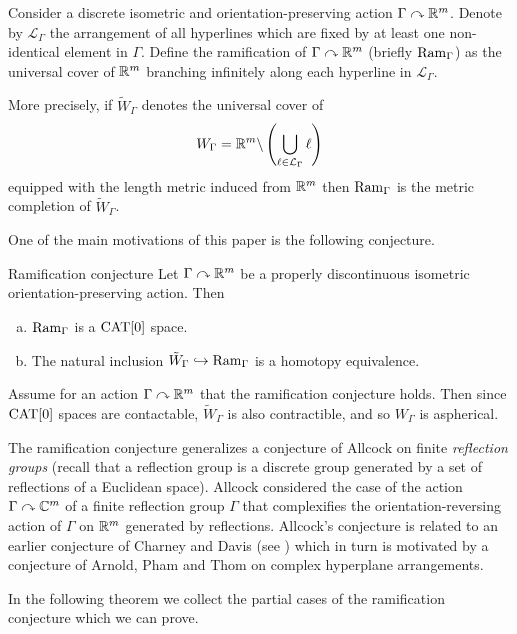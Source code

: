 \documentclass[oneside,a4paper]{article}
\begin{document}
Consider a discrete isometric and orientation-preserving action $\Gamma\curvearrowright\mathbb{R}^m$.
Denote by $\mathcal{L}_\Gamma$ the arrangement of all hyperlines which are fixed by at least one non-identical element in $\Gamma$. Define the ramification of $\Gamma\curvearrowright\mathbb{R}^m$
(briefly $\mathop{\rm Ram}\nolimits_\Gamma$)
as the universal cover of $\mathbb{R}^m$  branching infinitely  along each hyperline in $\mathcal{L}_\Gamma$.

More precisely, if $\tilde W_\Gamma$ denotes the universal cover of
$$W_\Gamma=\mathbb{R}^m\backslash
\left(\bigcup_{\ell\in\mathcal{L}_\Gamma}\ell\right)$$
equipped with the length metric induced from $\mathbb{R}^m$
then $\mathop{\rm Ram}\nolimits_\Gamma$ is the metric completion of $\tilde W_\Gamma$.

One of the main motivations of this paper is the following conjecture.

\begin{thm}{Ramification conjecture}\label{mainconjecture}
Let $\Gamma\curvearrowright\mathbb{R}^m$ be a properly discontinuous isometric orientation-preserving action.
Then
\begin{enumerate}[a)]
\item $\mathop{\rm Ram}\nolimits_\Gamma$ is a $\mathrm{CAT}[0]$ space.
\item The natural inclusion
$\tilde W_\Gamma\hookrightarrow \mathop{\rm Ram}\nolimits_\Gamma$ is a homotopy equivalence.
\end{enumerate}

\end{thm}

Assume for an action $\Gamma\curvearrowright\mathbb{R}^m$ that the ramification conjecture holds. 
Then since $\mathrm{CAT}[0]$ spaces are contactable,
$\tilde W_\Gamma$ is also contractible,
and so $W_\Gamma$ is aspherical.

The ramification conjecture generalizes a conjecture of Allcock  \cite[Conjecture 1.4]{allcock} on finite \emph{reflection groups} (recall that a reflection group is a discrete group generated by a set of reflections of a Euclidean space). 
Allcock considered the case of the action $\Gamma\curvearrowright\mathbb{C}^m$ of a finite reflection group $\Gamma$ that complexifies the  orientation-reversing action of $\Gamma$ on $\mathbb{R}^m$ generated by reflections. 
Allcock's conjecture is related to an earlier conjecture of Charney and Davis (see \cite[Conjecture 3]{charney-davis-95}) which in turn is motivated by a conjecture of Arnold, Pham and Thom on complex hyperplane  arrangements.

In the following theorem we collect the partial cases of the ramification conjecture which we can prove. 
\end{document}
